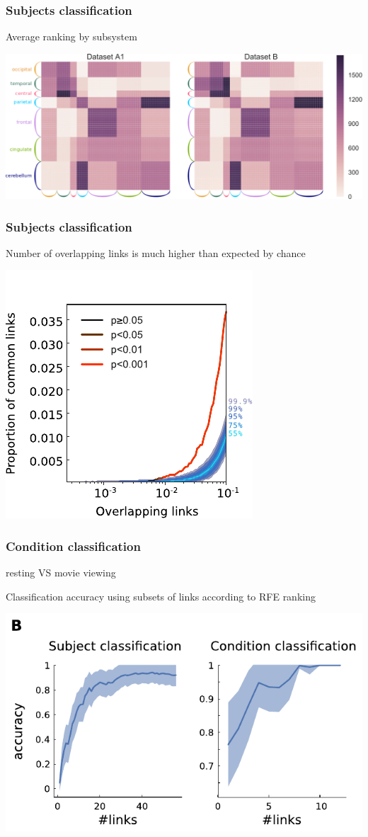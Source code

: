 \documentclass[final]{beamer}
\begin{document}
\begin{frame}
\frametitle{Subjects classification}
Average ranking by subsystem
\begin{center}
\includegraphics[width=0.8\columnwidth,valign=b]{avg_ranking_subsystems}
\end{center}
\end{frame}

\begin{frame}
\frametitle{Subjects classification}
Number of overlapping links is much higher than expected by chance
\begin{center}
\includegraphics[width=0.5\columnwidth,valign=b]{subj_H0}
\end{center}
\end{frame}

\begin{frame}
\frametitle{Condition classification}
resting VS movie viewing

\pause
Classification accuracy using subsets of links according to RFE ranking
\begin{center}
\includegraphics[width=0.8\columnwidth,valign=b]{subj_cond_results}
\end{center}
\end{frame}
\end{document}
